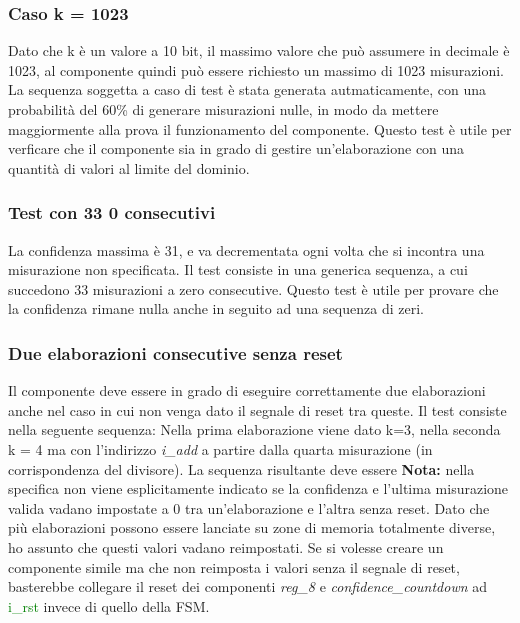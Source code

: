 \documentclass[12pt,a4paper]{scrartcl}
\begin{document}
   \subsubsection{Caso k = 1023}
   Dato che k è un valore a 10 bit, il massimo valore che può assumere in decimale è 1023, al componente quindi può essere richiesto un massimo di 1023 misurazioni.
   \newline La sequenza soggetta a caso di test è stata generata autmaticamente, con una probabilità del 60\% di generare misurazioni nulle, in modo da mettere maggiormente alla prova il funzionamento del componente.
   \newline Questo test è utile per verficare che il componente sia in grado di gestire un'elaborazione con una quantità di valori al limite del dominio.
   \subsubsection{Test con 33 0 consecutivi}
   La confidenza massima è 31, e va decrementata ogni volta che si incontra una misurazione non specificata.
   \newline Il test consiste in una generica sequenza, a cui succedono 33 misurazioni a zero consecutive.
   \newline Questo test è utile per provare che la confidenza rimane nulla anche in seguito ad una sequenza di zeri.
   \subsubsection{Due elaborazioni consecutive senza reset}
    Il componente deve essere in grado di eseguire correttamente due elaborazioni anche nel caso in cui non venga dato il segnale di reset tra queste.
    \newline Il test consiste nella seguente sequenza:
    \newline [29, 0, 255, 0, 0, 0 | 0, 0, 0, 0, 29, 0, 0, 0]
    \newline Nella prima elaborazione viene dato k=3, nella seconda k = 4 ma con l'indirizzo \textit{i\_add} a partire dalla quarta misurazione (in corrispondenza del divisore).
    \newline La sequenza risultante deve essere
    \newline [19, 31, 255, 31, 255, 30 | 0, 0, 0, 0, 29, 31, 29, 30]
    \newline \textbf{Nota:} nella specifica non viene esplicitamente indicato se la confidenza e l'ultima misurazione valida vadano impostate a 0 tra un'elaborazione e l'altra senza reset. Dato che più elaborazioni possono essere lanciate su zone di memoria totalmente diverse, ho assunto che questi valori vadano reimpostati. Se si volesse creare un componente simile ma che non reimposta i valori senza il segnale di reset, basterebbe collegare il reset dei componenti \textit{reg\_8} e \textit{confidence\_countdown} ad \textcolor{green}{i\_rst} invece di quello della FSM.
\end{document}
